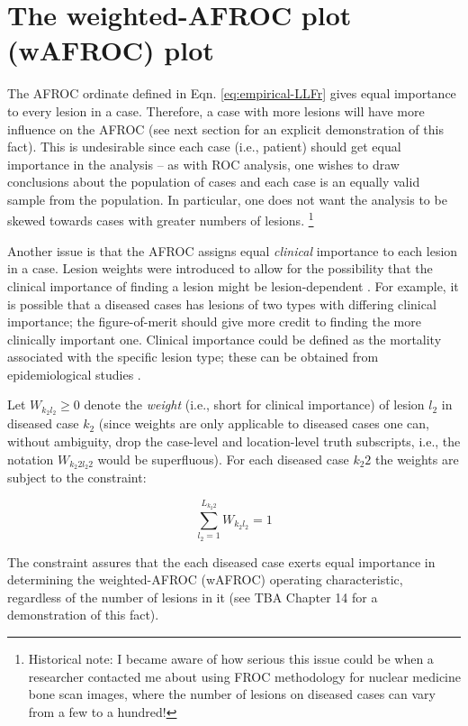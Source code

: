 \documentclass[
]{book}
\begin{document}
\hypertarget{empirical-wAFROC}{%
\section{The weighted-AFROC plot (wAFROC) plot}\label{empirical-wAFROC}}

The AFROC ordinate defined in Eqn. \eqref{eq:empirical-LLFr} gives equal importance to every lesion in a case. Therefore, a case with more lesions will have more influence on the AFROC (see next section for an explicit demonstration of this fact). This is undesirable since each case (i.e., patient) should get equal importance in the analysis -- as with ROC analysis, one wishes to draw conclusions about the population of cases and each case is an equally valid sample from the population. In particular, one does not want the analysis to be skewed towards cases with greater numbers of lesions. \footnote{Historical note: I became aware of how serious this issue could be when a researcher contacted me about using FROC methodology for nuclear medicine bone scan images, where the number of lesions on diseased cases can vary from a few to a hundred!}

Another issue is that the AFROC assigns equal \emph{clinical} importance to each lesion in a case. Lesion weights were introduced \citep{RN1385} to allow for the possibility that the clinical importance of finding a lesion might be lesion-dependent \citep{RN1966}. For example, it is possible that a diseased cases has lesions of two types with differing clinical importance; the figure-of-merit should give more credit to finding the more clinically important one. Clinical importance could be defined as the mortality associated with the specific lesion type; these can be obtained from epidemiological studies \citep{desantis2011breast}.

Let \(W_{k_2 l_2} \geq 0\) denote the \emph{weight} (i.e., short for clinical importance) of lesion \(l_2\) in diseased case \(k_2\) (since weights are only applicable to diseased cases one can, without ambiguity, drop the case-level and location-level truth subscripts, i.e., the notation \(W_{k_2 2 l_2 2}\) would be superfluous). For each diseased case \(k_2 2\) the weights are subject to the constraint:

\begin{equation}
\sum_{l_2 =1 }^{L_{k_2 2}} W_{k_2 l_2} = 1
\label{eq:empirical-weights-constraint}
\end{equation}

The constraint assures that the each diseased case exerts equal importance in determining the weighted-AFROC (wAFROC) operating characteristic, regardless of the number of lesions in it (see TBA Chapter 14 for a demonstration of this fact).
\end{document}
